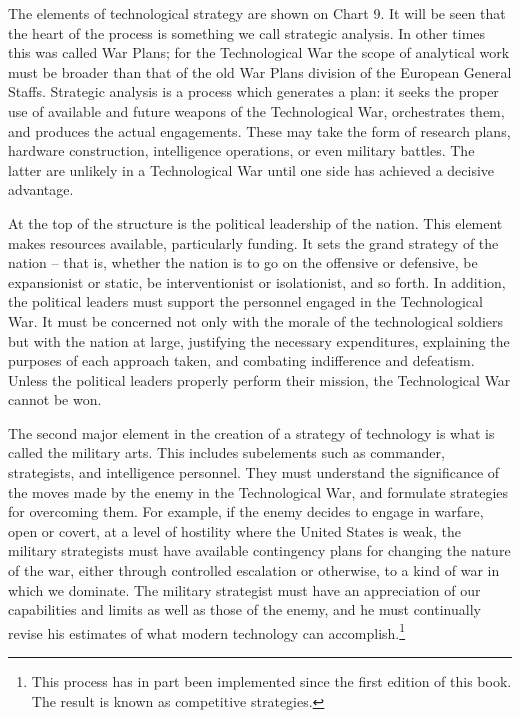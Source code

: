 The elements of technological strategy are shown on Chart 9. It will be seen that the heart of the process is something we call strategic analysis. In other times this was called War Plans; for the Technological War the scope of analytical work must be broader than that of the old War Plans division of the European General Staffs. Strategic analysis is a process which generates a plan: it seeks the proper use of available and future weapons of the Technological War, orchestrates them, and produces the actual engagements. These may take the form of research plans, hardware construction, intelligence operations, or even military battles. The latter are unlikely in a Technological War until one side has achieved a decisive advantage.

At the top of the structure is the political leadership of the nation. This element makes resources available, particularly funding. It sets the grand strategy of the nation -- that is, whether the nation is to go on the offensive or defensive, be expansionist or static, be interventionist or isolationist, and so forth. In addition, the political leaders must support the personnel engaged in the Technological War. It must be concerned not only with the morale of the technological soldiers but with the nation at large, justifying the necessary expenditures, explaining the purposes of each approach taken, and combating indifference and defeatism. Unless the political leaders properly perform their mission, the Technological War cannot be won.

The second major element in the creation of a strategy of technology is what is called the military arts. This includes subelements such as commander, strategists, and intelligence personnel. They must understand the significance of the moves made by the enemy in the Technological War, and formulate strategies for overcoming them. For example, if the enemy decides to engage in warfare, open or covert, at a level of hostility where the United States is weak, the military strategists must have available contingency plans for changing the nature of the war, either through controlled escalation or otherwise, to a kind of war in which we dominate. The military strategist must have an appreciation of our capabilities and limits as well as those of the enemy, and he must continually revise his estimates of what modern technology can accomplish.\footnote{This process has in part been implemented since the first edition of this book. The result is known as competitive strategies.}

